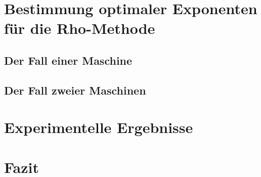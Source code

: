 \documentclass[a4paper, 10pt, ngerman]{article}
\begin{document}
\section{Bestimmung optimaler Exponenten für die Rho-Methode}

\subsection{Der Fall einer Maschine}

\subsection{Der Fall zweier Maschinen}

\section{Experimentelle Ergebnisse}

\section{Fazit}

\printbibliography
\end{document}

